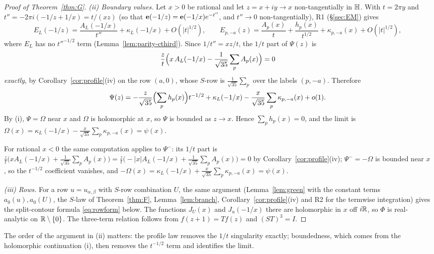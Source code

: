 \begin{proof}[Proof of Theorem~\ref{thm:G}]
\emph{(ii) Boundary values.} Let $x>0$ be rational and let $z=x+iy\to x$ non-tangentially in $\mathbb{H}$. With $t=2\pi y$ and $t''=-2\pi i(-1/z+1/x)=t/(xz)$
(so that $\mathbf{e}(-1/z)=\mathbf{e}(-1/x)e^{-t''}$, and $t''\to0$ non-tangentially), R1 (\S\ref{sec:EM}) gives
\[
E_L(-1/z)=\frac{A_L(-1/x)}{t''}+\kappa_L(-1/x)+O(|t|^{1/2}),\qquad E_{p,-a}(z)=\frac{A_p(x)}{t}+\frac{h_p(x)}{t^{1/2}}+\kappa_{p,-a}(x)+O(|t|^{1/2}),
\]
where $E_L$ has no $t''^{-1/2}$ term (Lemma~\ref{lem:parity-cthird}). Since $1/t''=xz/t$, the $1/t$ part of $\Psi(z)$ is
\[
\frac{z}{t}\Bigl(x\,A_L(-1/x)-\frac1{\sqrt{35}}\sum_pA_p(x)\Bigr)=0
\]
\emph{exactly}, by Corollary~\ref{cor:profile}(iv) on the row $(a,0)$, whose $S$-row is $\frac1{\sqrt{35}}\sum_p$ over the labels $(p,-a)$. Therefore
\[
\Psi(z)=-\frac{z}{\sqrt{35}}\Bigl(\sum_ph_p(x)\Bigr)t^{-1/2}+\kappa_L(-1/x)-\frac{x}{\sqrt{35}}\sum_p\kappa_{p,-a}(x)+o(1).
\]
By (i), $\Psi=\Omega$ near $x$ and $\Omega$ is holomorphic at $x$, so $\Psi$ is bounded as $z\to x$. Hence $\sum_ph_p(x)=0$, and the limit is
$\Omega(x)=\kappa_L(-1/x)-\frac{x}{\sqrt{35}}\sum_p\kappa_{p,-a}(x)=\psi(x)$.

For rational $x<0$ the same computation applies to $\Psi^-$: its $1/t$ part is $\frac zt\bigl(xA_L(-1/x)+\frac1{\sqrt{35}}\sum_pA_p(x)\bigr)=\frac zt\bigl(-|x|A_L(-1/x)+\frac1{\sqrt{35}}\sum_pA_p(x)\bigr)=0$
by Corollary~\ref{cor:profile}(iv); $\Psi^-=-\Omega$ is bounded near $x$, so the $t^{-1/2}$ coefficient vanishes, and
$-\Omega(x)=\kappa_L(-1/x)+\frac{x}{\sqrt{35}}\sum_p\kappa_{p,-a}(x)=\psi(x)$.

\emph{(iii) Rows.} For a row $u=u_{\alpha,\beta}$ with $S$-row combination $U$, the same argument (Lemma~\ref{lem:green} with the constant terms $a_0(u),a_0(U)$,
the $S$-law of Theorem~\ref{thm:F}, Lemma~\ref{lem:branch}, Corollary~\ref{cor:profile}(iv) and R2 for the termwise integration) gives the split-contour formula
\eqref{eq:rowform} below. The functions $J_U(x)$ and $J_u(-1/x)$ there are holomorphic in $x$ off $i\mathbb{R}$, so $\Phi$ is real-analytic on $\mathbb{R}\setminus\{0\}$. The
three-term relation follows from $f(z+1)=Tf(z)$ and $(ST)^3=I$.
\end{proof}
The order of the argument in (ii) matters: the profile law removes the $1/t$ singularity exactly; boundedness, which comes from the holomorphic
continuation (i), then removes the $t^{-1/2}$ term and identifies the limit.

